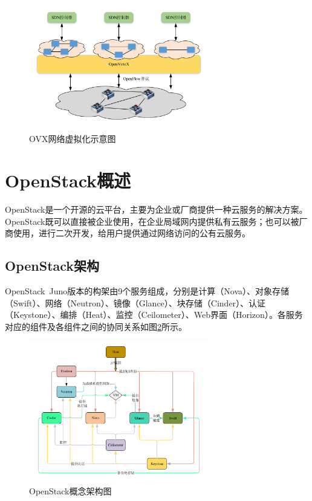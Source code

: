 \begin{figure}[!htb]
  \centering
  \includegraphics[width=0.7\textwidth]{logo/ovx}
  \caption{OVX网络虚拟化示意图}
  \label{fig:ovx}
\end{figure}

\section{OpenStack概述}

OpenStack是一个开源的云平台，主要为企业或厂商提供一种云服务的解决方案\cite{OpenStack-5}。OpenStack既可以直接被企业使用，在企业局域网内提供私有云服务；也可以被厂商使用，进行二次开发，给用户提供通过网络访问的公有云服务\cite{OpenStack-6}。

\subsection{OpenStack架构}
OpenStack\ Juno版本的构架由9个服务组成，分别是计算（Nova）、对象存储（Swift）、网络（Neutron）、镜像（Glance）、块存储（Cinder）、认证（Keystone）、编排（Heat）、监控（Ceilometer）、Web界面（Horizon）\cite{OpenStack-4}。各服务对应的组件及各组件之间的协同关系如图\ref{fig:openstack}所示。

\begin{figure}[!htb]
  \centering
  \includegraphics[width=0.7\textwidth]{logo/openstack}
  \caption{OpenStack概念架构图}
  \label{fig:openstack}
\end{figure}

